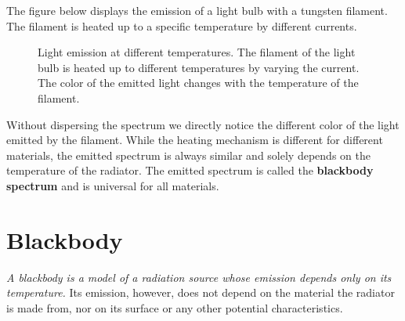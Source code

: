 \documentclass[
  a4paper,
]{book}
\begin{document}
The figure below displays the emission of a light bulb with a tungsten
filament. The filament is heated up to a specific temperature by
different currents.

\begin{figure}


\caption{\label{fig-light-bulb}Light emission at different temperatures.
The filament of the light bulb is heated up to different temperatures by
varying the current. The color of the emitted light changes with the
temperature of the filament.}

\end{figure}%

Without dispersing the spectrum we directly notice the different color
of the light emitted by the filament. While the heating mechanism is
different for different materials, the emitted spectrum is always
similar and solely depends on the temperature of the radiator. The
emitted spectrum is called the \textbf{blackbody spectrum} and is
universal for all materials.

\section{Blackbody}\label{blackbody}

\begin{tcolorbox}[enhanced jigsaw, coltitle=black, title=\textcolor{quarto-callout-note-color}{\faInfo}\hspace{0.5em}{Note}, colframe=quarto-callout-note-color-frame, toprule=.15mm, opacitybacktitle=0.6, left=2mm, opacityback=0, breakable, toptitle=1mm, bottomtitle=1mm, leftrule=.75mm, arc=.35mm, titlerule=0mm, colbacktitle=quarto-callout-note-color!10!white, rightrule=.15mm, bottomrule=.15mm, colback=white]

\emph{A blackbody is a model of a radiation source whose emission
depends only on its temperature.} Its emission, however, does not depend
on the material the radiator is made from, nor on its surface or any
other potential characteristics.

\end{tcolorbox}
\end{document}

